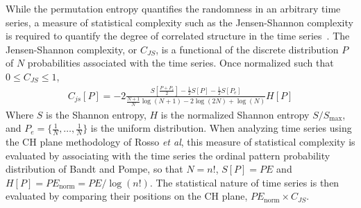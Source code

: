 \documentclass[aps,pre,twocolumn,secnumarabic,nobalancelastpage,amsmath,amssymb,
nofootinbib]{revtex4-1}
\begin{document}
While the permutation entropy quantifies the randomness in an arbitrary time series, a measure of statistical complexity such as the Jensen-Shannon complexity is required to quantify the degree of correlated structure in the time series~\cite{rosso2007}. The Jensen-Shannon complexity, or $C_{JS}$, is a functional of the discrete distribution $P$ of $N$ probabilities associated with the time series. Once normalized such that $0 \leq C_{JS} \leq 1$, 
\begin{align}
C_{js}[P] = -2\frac{S \left[ \frac{P+P_e}{2} \right] - \frac{1}{2}S[P]-\frac{1}{2}S[P_e] }{\frac{N+1}{N} \log(N+1)-2 \log(2N)+\log(N)}H[P]
\end{align}
Where $S$ is the Shannon entropy, $H$ is the normalized Shannon entropy $S/S_{\text{max}}$, and $P_e=\{\frac{1}{N}, \ldots, \frac{1}{N} \}$ is the uniform distribution. When analyzing time series using the CH plane methodology of Rosso \textit{et al}, this measure of statistical complexity is evaluated by associating with the time series the ordinal pattern probability distribution of Bandt and Pompe, so that $N=n!$, $S[P]=PE$ and $H[P]=PE_{\text{norm}}=PE/\log(n!)$. The statistical nature of time series is then evaluated by comparing their positions on the CH plane, $PE_{\text{norm}} \times C_{JS}$.
\end{document}
